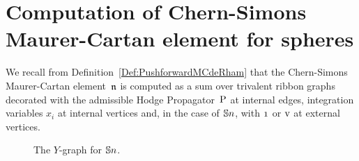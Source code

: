 \documentclass[\MainFolder/Text.tex]{subfiles}
\begin{document}
\section{Computation of Chern-Simons Maurer-Cartan element for spheres}
\allowdisplaybreaks
\label{Section:MCSphere}

We recall from Definition~\ref{Def:PushforwardMCdeRham} that the Chern-Simons Maurer-Cartan element~$\mathfrak{n}$ is computed as a sum over trivalent ribbon graphs decorated with the admissible Hodge Propagator~$\mathrm{P}$ at internal edges, integration variables $x_i$ at internal vertices and, in the case of $\mathbb{S}{n}$, with $\NOne$ or $\mathrm{v}$ at external vertices.
\begin{figure}[t]
\centering

\caption{The $Y$-graph for $\mathbb{S}{n}$.}\label{Fig:YGraph}
\end{figure}
\end{document}
